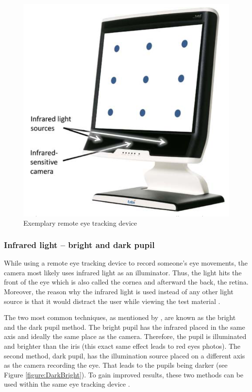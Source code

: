 \begin{figure}[!ht]
    \centering
    \includegraphics[width=0.75\linewidth]{images/remote_biedert2010eyebook.png}
    \caption{
        Exemplary remote eye tracking device \autocite[274]{biedert2010eyebook}
    }
    \label{figure:Remote}
\end{figure}

\subsubsection{Infrared light -- bright and dark pupil}
While using a remote eye tracking device to record someone's eye movements, the camera most likely uses infrared light as an illuminator. Thus, the light hits the front of the eye which is also called the cornea and afterward the back, the retina. 
Moreover, the reason why the infrared light is used instead of any other light source is that it would distract the user while viewing the test material \autocite[]{poole2006eye, biedert2010eyebook}.

The two most common techniques, as mentioned by \textcite[]{goldberg2003eye}, are known as the bright and the dark pupil method. The bright pupil has the infrared placed in the same axis and ideally the same place as the camera. Therefore, the pupil is illuminated and brighter than the iris (this exact same effect leads to red eyes photos). The second method, dark pupil, has the illumination source placed on a different axis as the camera recording the eye. That leads to the pupils being darker (see Figure \ref{figure:DarkBright}). To gain improved results, these two methods can be used within the same eye tracking device \autocite[]{tobii2018dark, goldberg2003eye}. 

